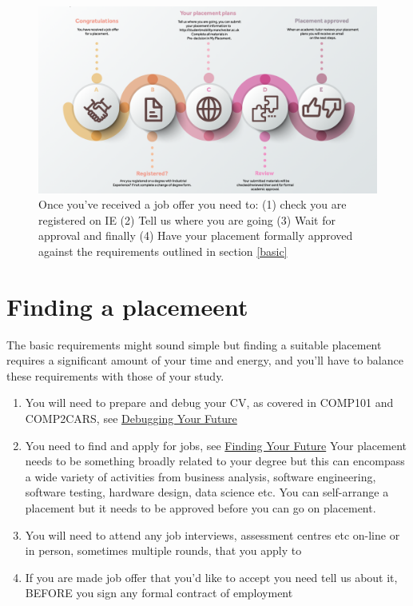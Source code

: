 \documentclass[
]{book}
\providecommand{\tightlist}{%
  \setlength{\itemsep}{0pt}\setlength{\parskip}{0pt}}
\begin{document}
\begin{figure}

{\centering \includegraphics[width=1\linewidth]{images/plans} 

}

\caption{Once you've received a job offer you need to: (1) check you are registered on IE (2) Tell us where you are going (3) Wait for approval and finally (4) Have your placement formally approved against the requirements outlined in section \ref{basic}}\label{fig:plans-fig}
\end{figure}



\section{Finding a placemeent}\label{finding}

The basic requirements might sound simple but finding a suitable placement requires a significant amount of your time and energy, and you'll have to balance these requirements with those of your study.

\begin{enumerate}
\def\labelenumi{\arabic{enumi}.}
\tightlist
\item
  You will need to prepare and debug your CV, as covered in COMP101 and COMP2CARS, see \href{https://www.cdyf.me/debugging}{Debugging Your Future} \citep{debugging}
\item
  You need to find and apply for jobs, see \href{https://www.cdyf.me/finding}{Finding Your Future} \citep{finding} Your placement needs to be something broadly related to your degree but this can encompass a wide variety of activities from business analysis, software engineering, software testing, hardware design, data science etc. You can self-arrange a placement but it needs to be approved before you can go on placement.
\item
  You will need to attend any job interviews, assessment centres etc on-line or in person, sometimes multiple rounds, that you apply to
\item
  If you are made job offer that you'd like to accept you need tell us about it, BEFORE you sign any formal contract of employment
\end{enumerate}
\end{document}
